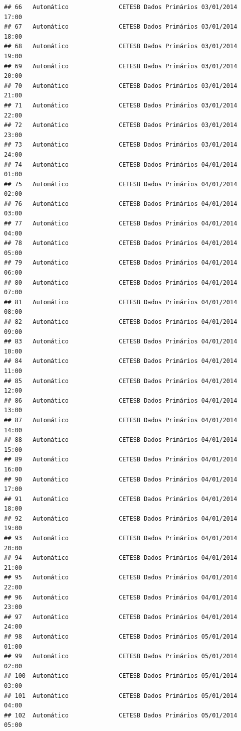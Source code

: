 \documentclass[]{book}
\begin{document}
\begin{verbatim}
## 66   Automático              CETESB Dados Primários 03/01/2014 17:00
## 67   Automático              CETESB Dados Primários 03/01/2014 18:00
## 68   Automático              CETESB Dados Primários 03/01/2014 19:00
## 69   Automático              CETESB Dados Primários 03/01/2014 20:00
## 70   Automático              CETESB Dados Primários 03/01/2014 21:00
## 71   Automático              CETESB Dados Primários 03/01/2014 22:00
## 72   Automático              CETESB Dados Primários 03/01/2014 23:00
## 73   Automático              CETESB Dados Primários 03/01/2014 24:00
## 74   Automático              CETESB Dados Primários 04/01/2014 01:00
## 75   Automático              CETESB Dados Primários 04/01/2014 02:00
## 76   Automático              CETESB Dados Primários 04/01/2014 03:00
## 77   Automático              CETESB Dados Primários 04/01/2014 04:00
## 78   Automático              CETESB Dados Primários 04/01/2014 05:00
## 79   Automático              CETESB Dados Primários 04/01/2014 06:00
## 80   Automático              CETESB Dados Primários 04/01/2014 07:00
## 81   Automático              CETESB Dados Primários 04/01/2014 08:00
## 82   Automático              CETESB Dados Primários 04/01/2014 09:00
## 83   Automático              CETESB Dados Primários 04/01/2014 10:00
## 84   Automático              CETESB Dados Primários 04/01/2014 11:00
## 85   Automático              CETESB Dados Primários 04/01/2014 12:00
## 86   Automático              CETESB Dados Primários 04/01/2014 13:00
## 87   Automático              CETESB Dados Primários 04/01/2014 14:00
## 88   Automático              CETESB Dados Primários 04/01/2014 15:00
## 89   Automático              CETESB Dados Primários 04/01/2014 16:00
## 90   Automático              CETESB Dados Primários 04/01/2014 17:00
## 91   Automático              CETESB Dados Primários 04/01/2014 18:00
## 92   Automático              CETESB Dados Primários 04/01/2014 19:00
## 93   Automático              CETESB Dados Primários 04/01/2014 20:00
## 94   Automático              CETESB Dados Primários 04/01/2014 21:00
## 95   Automático              CETESB Dados Primários 04/01/2014 22:00
## 96   Automático              CETESB Dados Primários 04/01/2014 23:00
## 97   Automático              CETESB Dados Primários 04/01/2014 24:00
## 98   Automático              CETESB Dados Primários 05/01/2014 01:00
## 99   Automático              CETESB Dados Primários 05/01/2014 02:00
## 100  Automático              CETESB Dados Primários 05/01/2014 03:00
## 101  Automático              CETESB Dados Primários 05/01/2014 04:00
## 102  Automático              CETESB Dados Primários 05/01/2014 05:00

\end{verbatim}
\end{document}
